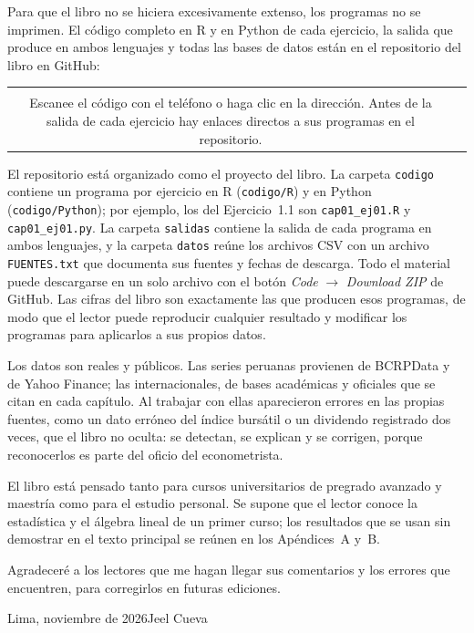 Para que el libro no se hiciera excesivamente extenso, los programas no se imprimen. El código completo en
R y en Python de cada ejercicio, la salida que produce en ambos lenguajes y todas las bases de datos están
en el repositorio del libro en GitHub:
\begin{center}
\begin{tabular}{@{}c@{\qquad}l@{}}
\raisebox{-0.5\height}{\qrcode[height=2.6cm]{\sitioweb}} &
\begin{minipage}{0.62\linewidth}\raggedright
\href{\sitioweb}{\nolinkurl{\sitioweb}}\\[6pt]
\small Escanee el código con el teléfono o haga clic en la dirección. Antes de la salida de cada ejercicio
hay enlaces directos a sus programas en el repositorio.
\end{minipage}
\end{tabular}
\end{center}
El repositorio está organizado como el proyecto del libro. La carpeta \texttt{codigo} contiene un programa
por ejercicio en R (\texttt{codigo/R}) y en Python (\texttt{codigo/Python}); por ejemplo, los del
Ejercicio~1.1 son \texttt{cap01\_ej01.R} y \texttt{cap01\_ej01.py}. La carpeta \texttt{salidas} contiene la
salida de cada programa en ambos lenguajes, y la carpeta \texttt{datos} reúne los archivos CSV con un
archivo \texttt{FUENTES.txt} que documenta sus fuentes y fechas de descarga. Todo el material puede
descargarse en un solo archivo con el botón \emph{Code} $\rightarrow$ \emph{Download ZIP} de GitHub.
Las cifras del libro son exactamente las que producen esos programas, de
modo que el lector puede reproducir cualquier resultado y modificar los programas para aplicarlos a sus
propios datos.

Los datos son reales y públicos. Las series peruanas provienen de BCRPData y de Yahoo Finance; las
internacionales, de bases académicas y oficiales que se citan en cada capítulo. Al trabajar con ellas
aparecieron errores en las propias fuentes, como un dato erróneo del índice bursátil o un dividendo
registrado dos veces, que el libro no oculta: se detectan, se explican y se corrigen, porque reconocerlos
es parte del oficio del econometrista.

El libro está pensado tanto para cursos universitarios de pregrado avanzado y maestría como para el
estudio personal. Se supone que el lector conoce la estadística y el álgebra lineal de un primer curso;
los resultados que se usan sin demostrar en el texto principal se reúnen en los Apéndices~A y~B.

Agradeceré a los lectores que me hagan llegar sus comentarios y los errores que encuentren, para
corregirlos en futuras ediciones.

\bigskip
\noindent Lima, noviembre de 2026\hfill Jeel Cueva
